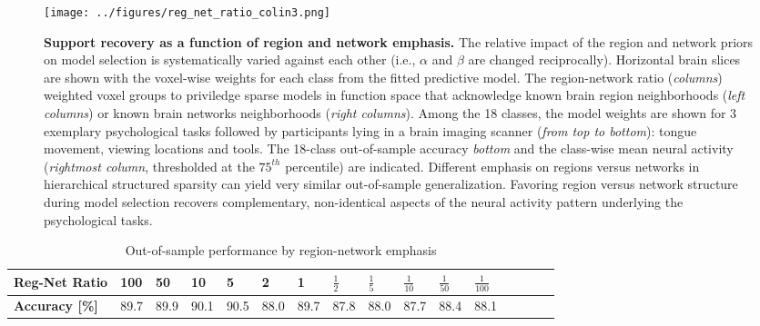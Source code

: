 \documentclass[runningheads,a4paper]{llncs}
\begin{document}
\begin{figure}
  \vspace{-0.6cm}
  \begin{centering}
    \texttt{[image: ../figures/reg\_net\_ratio\_colin3.png]}
    \vspace{-0.3cm}
    \caption{\textbf{Support recovery as a function of
    region and network emphasis.}
    The relative impact of the region and network priors
    on model selection
    is systematically varied against each other
    (i.e., $\alpha$ and $\beta$ are changed reciprocally).
    Horizontal brain slices are shown with the voxel-wise weights for each class
    from the fitted predictive model.
    The region-network ratio (\textit{columns}) weighted voxel groups
    to priviledge sparse models in function space
    that acknowledge known brain region neighborhoods
    (\textit{left columns}) or
    known brain networks neighborhoods
    (\textit{right columns}).
    Among the 18 classes, the model weights are shown for 3 exemplary
    psychological
    tasks followed by participants lying in a brain imaging scanner
    (\textit{from top to bottom}): tongue movement,
    viewing locations and tools.
    The 18-class out-of-sample accuracy \textit{bottom} and
    the class-wise mean neural activity
    (\textit{rightmost column}, thresholded at the $75^{th}$ percentile)
    are indicated.
    Different emphasis on regions versus networks
    in hierarchical structured sparsity can
    yield very similar out-of-sample generalization.
    Favoring region versus network structure during model selection
    recovers complementary, non-identical aspects of
    the neural activity pattern underlying the psychological tasks.
    }
    \label{fig_regnetratio}
  \end{centering}
  \vspace{-0.6cm}
\end{figure}
\begin{table}[]
  \vspace{-0.6cm}
  \centering
  \caption{Out-of-sample performance by region-network emphasis}
  \vspace{-0.3cm}
  \begin{tabular}{l|l|l|l|l|l|l|l|l|l|l|l|l|l|l|l}
    \textbf{Reg-Net Ratio}          & 100   & 50    & 10   & 5     & 2    & 1     & $\frac{1}{2}$  & $\frac{1}{5}$  & $\frac{1}{10}$ & $\frac{1}{50}$ & $\frac{1}{100}$ \\ \hline
    \textbf{Accuracy {[}\%{]}}             & 89.7  & 89.9  & 90.1 & 90.5  & 88.0 & 89.7  & 87.8           & 88.0           & 87.7           & 88.4           & 88.1  
  \end{tabular}
  \vspace{-0.6cm}
  \label{table_reg_net_ratio}
\end{table}
\end{document}
